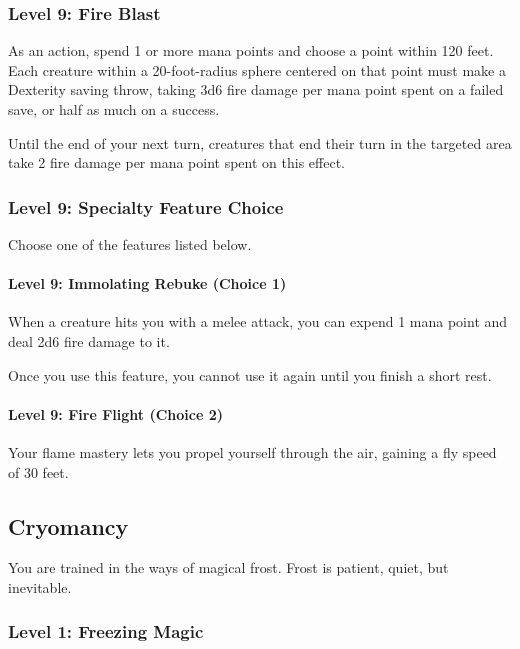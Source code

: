 \documentclass[12pt,letterpaper,twocolumn,openany,nodeprecatedcode,bg=none]{dndbook}
\let\oldsubsection\subsection
\renewcommand{\subsection}[1]{%
  \needspace{5\baselineskip}%
  \oldsubsection{#1}%
}
\begin{document}
\subsubsection{Level 9: Fire Blast}\label{level-9-fire-blast}

As an action, spend 1 or more mana points and choose a point within 120
feet. Each creature within a 20-foot-radius sphere centered on that
point must make a Dexterity saving throw, taking 3d6 fire damage per
mana point spent on a failed save, or half as much on a success.

Until the end of your next turn, creatures that end their turn in the
targeted area take 2 fire damage per mana point spent on this effect.

\subsubsection{Level 9: Specialty Feature
Choice}\label{level-9-specialty-feature-choice}

Choose one of the features listed below.

\paragraph{Level 9: Immolating Rebuke (Choice
1)}\label{level-9-immolating-rebuke-choice-1}

When a creature hits you with a melee attack, you can expend 1 mana
point and deal 2d6 fire damage to it.

Once you use this feature, you cannot use it again until you finish a
short rest.

\paragraph{Level 9: Fire Flight (Choice
2)}\label{level-9-fire-flight-choice-2}

Your flame mastery lets you propel yourself through the air, gaining a
fly speed of 30 feet.

\clearpage

\subsection{Cryomancy}\label{cryomancy}

You are trained in the ways of magical frost. Frost is patient, quiet,
but inevitable.

\subsubsection{Level 1: Freezing Magic}\label{level-1-freezing-magic}
\end{document}
